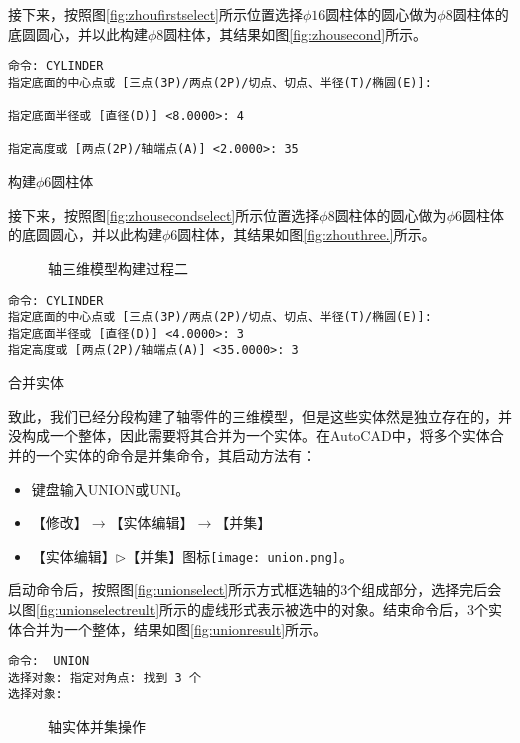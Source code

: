 \begin{procedure}
接下来，按照图\ref{fig:zhoufirstselect}所示位置选择$\phi 16$圆柱体的圆心做为$\phi 8$圆柱体的底圆圆心，并以此构建$\phi 8$圆柱体，其结果如图\ref{fig:zhousecond}所示。

\begin{lstlisting}
命令: CYLINDER
指定底面的中心点或 [三点(3P)/两点(2P)/切点、切点、半径(T)/椭圆(E)]:

指定底面半径或 [直径(D)] <8.0000>: 4

指定高度或 [两点(2P)/轴端点(A)] <2.0000>: 35
\end{lstlisting}
\item 构建$\phi 6$圆柱体

接下来，按照图\ref{fig:zhousecondselect}所示位置选择$\phi 8$圆柱体的圆心做为$\phi 6$圆柱体的底圆圆心，并以此构建$\phi 6$圆柱体，其结果如图\ref{fig:zhouthree.}所示。

\begin{figure}[htbp]
\centering
{}\hspace{30pt}
\caption{轴三维模型构建过程二}
\end{figure}

\begin{lstlisting}
命令: CYLINDER
指定底面的中心点或 [三点(3P)/两点(2P)/切点、切点、半径(T)/椭圆(E)]:
指定底面半径或 [直径(D)] <4.0000>: 3
指定高度或 [两点(2P)/轴端点(A)] <35.0000>: 3
\end{lstlisting}
\item 合并实体

致此，我们已经分段构建了轴零件的三维模型，但是这些实体然是独立存在的，并没构成一个整体，因此需要将其合并为一个实体。在AutoCAD中，将多个实体合并的一个实体的命令是并集命令，其启动方法有：
\begin{itemize}
\item 键盘输入UNION或UNI。
\item 【修改】$\rightarrow$【实体编辑】$\rightarrow$【并集】
\item 【实体编辑】$\triangleright$【并集】图标\texttt{[image: union.png]}。
\end{itemize}

启动命令后，按照图\ref{fig:unionselect}所示方式框选轴的3个组成部分，选择完后会以图\ref{fig:unionselectreult}所示的虚线形式表示被选中的对象。结束命令后，3个实体合并为一个整体，结果如图\ref{fig:unionresult}所示。
\begin{lstlisting}
命令:  UNION
选择对象: 指定对角点: 找到 3 个
选择对象:
\end{lstlisting}
\begin{figure}[htbp]
\centering
{}\hspace{20pt}
\hspace{20pt}
\caption{轴实体并集操作}
\end{figure}


\end{procedure}
